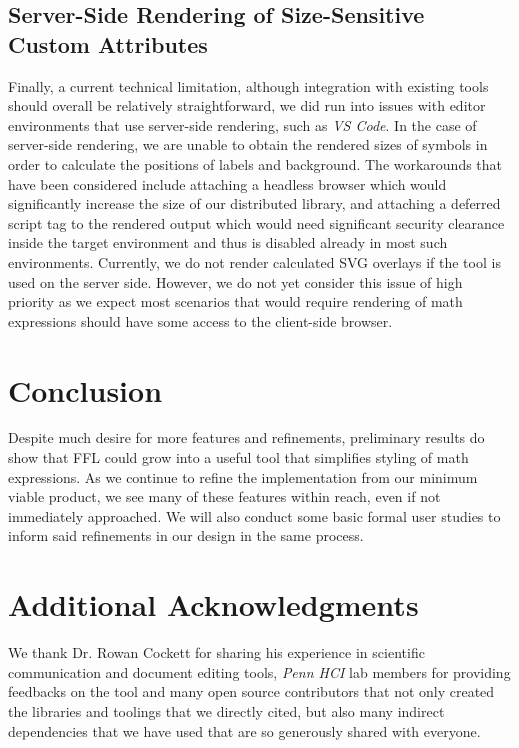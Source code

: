 \documentclass{article}
\begin{document}
\begin{multicols*}{2}
  \subsection*{Server-Side Rendering of Size-Sensitive Custom Attributes}
  Finally, a current technical limitation, although integration with existing tools
  should overall be relatively straightforward, we did run into issues with editor
  environments that use server-side rendering, such as \textit{VS Code}. In the case
  of server-side rendering, we are unable to obtain the rendered sizes of symbols
  in order to calculate the positions of labels and background. The workarounds that
  have been considered include attaching a headless browser which would significantly
  increase the size of our distributed library, and attaching a deferred script tag to
  the rendered output which would need significant security clearance inside the target
  environment and thus is disabled already in most such environments. Currently,
  we do not render calculated SVG overlays if the tool is used on the server side.
  However, we do not yet consider this issue of high priority as we expect most 
  scenarios that would require rendering of math expressions should have some access
  to the client-side browser.
  \section*{Conclusion}
  Despite much desire for more features and refinements, preliminary results do
  show that FFL could grow into a useful tool that simplifies styling of math
  expressions. As we continue to refine the implementation from our minimum viable
  product, we see many of these features within reach, even if not immediately approached.
  We will also conduct some basic formal user studies to inform said refinements
  in our design in the same process.
  \section*{Additional Acknowledgments}
  We thank Dr. Rowan Cockett for sharing his experience in scientific communication
  and document editing tools, \textit{Penn HCI} lab members for providing feedbacks
  on the tool and many open source contributors that not only created
  the libraries and toolings that we directly cited, but also many indirect dependencies
  that we have used that are so generously shared with everyone.
\end{multicols*}
  
\end{document}
